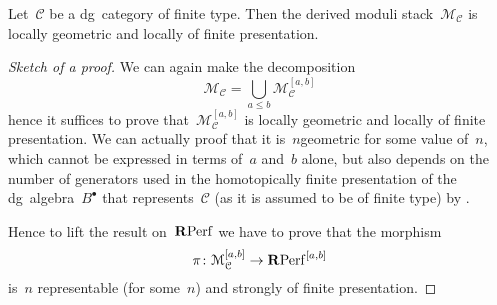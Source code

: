 \begin{refsection}
\begin{theorem}
  \label{theorem:main-theorem}
  Let~$\mathcal{C}$ be a dg~category of finite type. Then the derived moduli stack~$\mathcal{M}_{\mathcal{C}}$ is locally geometric and locally of finite presentation.

  \begin{proof}[Sketch of a proof]
    We can again make the decomposition
    \begin{equation}
      \mathcal{M}_{\mathcal{C}}=\bigcup_{a\leq b}\mathcal{M}_{\mathcal{C}}^{[a,b]}
    \end{equation}
    hence it suffices to prove that~$\mathcal{M}_{\mathcal{C}}^{[a,b]}$ is locally geometric and locally of finite presentation. We can actually proof that it is~$n$\dash geometric for some value of~$n$, which cannot be expressed in terms of~$a$ and~$b$ alone, but also depends on the number of generators used in the homotopically finite presentation of the dg~algebra~$B^\bullet$ that represents~$\mathcal{C}$ (as it is assumed to be of finite type) by \cite[corollary 2.12]{toen-vaquie}.

    Hence to lift the result on~$\mathbf{R}\mathrm{Perf}$ we have to prove that the morphism
    \begin{equation}
      \pi\colon\mathcal{M}_{\mathcal{C}}^{[a,b]}\to\mathbf{R}\mathrm{Perf}^{[a,b]}
    \end{equation}
    is~$n$ representable (for some~$n$) and strongly of finite presentation.
  \end{proof}
\end{theorem}


\end{refsection}
